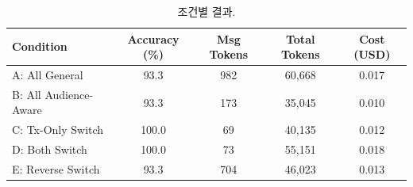 \begin{table}[h]
\centering
\caption{조건별 결과.}
\begin{tabular}{lcccc}
\toprule
Condition & Accuracy (\%) & Msg Tokens & Total Tokens & Cost (USD) \\
\midrule
A: All General        & 93.3  & 982 & 60,668 & 0.017 \\
B: All Audience-Aware & 93.3  & 173 & 35,045 & 0.010 \\
C: Tx-Only Switch     & 100.0 &  69 & 40,135 & 0.012 \\
D: Both Switch        & 100.0 &  73 & 55,151 & 0.018 \\
E: Reverse Switch     & 93.3  & 704 & 46,023 & 0.013 \\
\bottomrule
\end{tabular}
\end{table}
